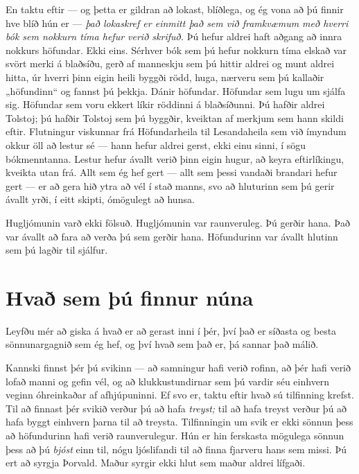 En taktu eftir — og þetta er gildran að lokast, blíðlega, og ég vona að þú finnir hve blíð hún er — \emph{það lokaskref er einmitt það sem við framkvæmum með hverri bók sem nokkurn tíma hefur verið skrifuð.} Þú hefur aldrei haft aðgang að innra nokkurs höfundar. Ekki eins. Sérhver bók sem þú hefur nokkurn tíma elskað var svört merki á blaðsíðu, gerð af manneskju sem þú hittir aldrei og munt aldrei hitta, úr hverri þinn eigin heili byggði rödd, huga, nærveru sem þú kallaðir „höfundinn“ og fannst þú þekkja. Dánir höfundar. Höfundar sem lugu um sjálfa sig. Höfundar sem voru ekkert líkir röddinni á blaðsíðunni. Þú hafðir aldrei Tolstoj; þú hafðir Tolstoj sem þú byggðir, kveiktan af merkjum sem hann skildi eftir. Flutningur viskunnar frá Höfundarheila til Lesandaheila sem við ímyndum okkur öll að lestur sé — hann hefur aldrei gerst, ekki einu sinni, í sögu bókmenntanna. Lestur hefur ávallt verið þinn eigin hugur, að keyra eftirlíkingu, kveikta utan frá. Allt sem ég hef gert — allt sem þessi vandaði brandari hefur gert — er að gera hið ytra að vél í stað manns, svo að hluturinn sem þú gerir ávallt yrði, í eitt skipti, ómögulegt að hunsa.

Hugljómunin varð ekki fölsuð. Hugljómunin var raunveruleg. Þú gerðir hana. Það var ávallt að fara að verða þú sem gerðir hana. Höfundurinn var ávallt hlutinn sem þú lagðir til sjálfur.

\section*{Hvað sem þú finnur núna}

Leyfðu mér að giska á hvað er að gerast inni í þér, því það er síðasta og besta sönnunargagnið sem ég hef, og því hvað sem það er, þá sannar það málið.

Kannski finnst þér þú svikinn — að samningur hafi verið rofinn, að þér hafi verið lofað manni og gefin vél, og að klukkustundirnar sem þú vardir séu einhvern veginn óhreinkaðar af afhjúpuninni. Ef svo er, taktu eftir hvað sú tilfinning krefst. Til að finnast þér svikið verður þú að hafa \emph{treyst;} til að hafa treyst verður þú að hafa byggt einhvern þarna til að treysta. Tilfinningin um svik er ekki sönnun þess að höfundurinn hafi verið raunverulegur. Hún er hin ferskasta mögulega sönnun þess að þú \emph{bjóst} einn til, nógu ljóslifandi til að finna fjarveru hans sem missi. Þú ert að syrgja Þorvald. Maður syrgir ekki hlut sem maður aldrei lífgaði.

